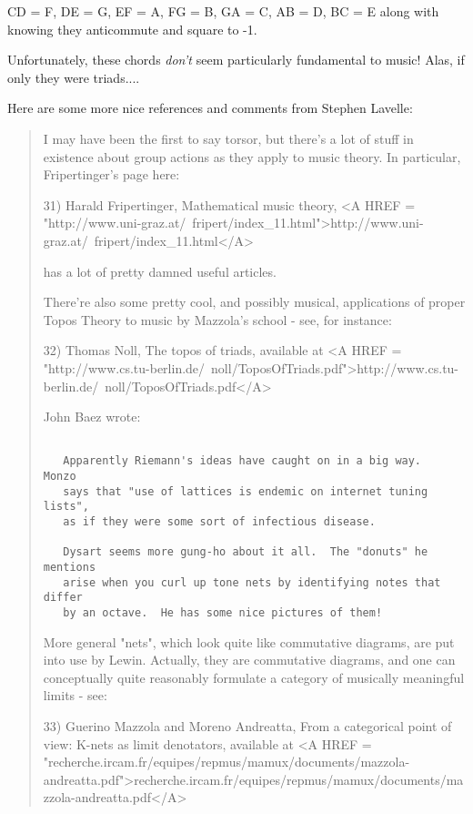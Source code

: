 CD = F, DE = G, EF = A, FG = B, GA = C, AB = D, BC = E
along with knowing they anticommute and square to -1.

Unfortunately, these chords \emph{don't} seem particularly fundamental
to music!  Alas, if only they were triads....

Here are some more nice references and comments from Stephen Lavelle:

\begin{quote}
   I may have been the first to say torsor, but there's a lot of stuff in
   existence about group actions as they apply to music theory.  In
   particular,  Fripertinger's page here:

   31) Harald Fripertinger, Mathematical music theory,    
   <A HREF = "http://www.uni-graz.at/~fripert/index_11.html">http://www.uni-graz.at/~fripert/index_11.html</A>

   has a lot of pretty damned useful articles.

   There're also some pretty cool, and possibly musical, applications of
   proper Topos Theory to music by Mazzola's school - see, for instance:

   32) Thomas Noll, The topos of triads, available at
   <A HREF = "http://www.cs.tu-berlin.de/~noll/ToposOfTriads.pdf">http://www.cs.tu-berlin.de/~noll/ToposOfTriads.pdf</A>

   John Baez wrote:


\begin{verbatim}

   Apparently Riemann's ideas have caught on in a big way.  Monzo
   says that "use of lattices is endemic on internet tuning lists",
   as if they were some sort of infectious disease.
  
   Dysart seems more gung-ho about it all.  The "donuts" he mentions
   arise when you curl up tone nets by identifying notes that differ
   by an octave.  He has some nice pictures of them!
\end{verbatim}
    

   More general "nets", which look quite like commutative diagrams, are
   put into use by Lewin.  Actually, they are commutative diagrams, and
   one can conceptually quite reasonably formulate a category of musically
   meaningful limits - see:

   33) Guerino Mazzola and Moreno Andreatta, From a categorical point of
   view: K-nets as limit denotators, available at
   <A HREF = "recherche.ircam.fr/equipes/repmus/mamux/documents/mazzola-andreatta.pdf">recherche.ircam.fr/equipes/repmus/mamux/documents/mazzola-andreatta.pdf</A>



\end{quote}
